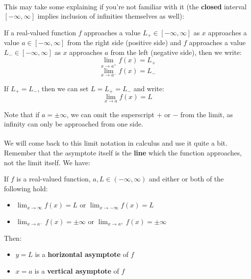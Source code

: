 \documentclass[12pt, a4paper, titlepage, twoside]{article}
\begin{document}
	\paragraph{}
	This may take some explaining if you're not familiar with it (the \textbf{closed} interval $[-\infty, \infty]$ implies inclusion of 
	infinities themselves as well):\\
	
	\begin{kp}
		If a real-valued function $f$ approaches a value $L_+ \in [-\infty, \infty]$
		as $x$ approaches a value $a \in [-\infty, \infty]$ from the right side (positive side) and $f$ approaches a value $L_- \in [-\infty, \infty]$
		as $x$ approaches $a$ from the left (negative side), then we write:
		\[ \lim_{x \to a^+} f(x) = L_+ \]
		\[ \lim_{x \to a^-} f(x) = L_- \]
		
		If $L_+ = L_-$, then we can set $L = L_+ = L_-$ and write:
		\[ \lim_{x \to a} f(x) = L \]
		
		Note that if $a = \pm \infty$, we can omit the superscript $+$ or $-$ from the limit, as infinity can only be approached from one side.
	\end{kp}
	
	\paragraph{}
	We will come back to this limit notation in calculus and use it quite a bit.
	Remember that the asymptote itself is the \textbf{line} which the function approaches, not the limit itself. We have:\\
	
	\begin{kp}[Asymptotes]
		If $f$ is a real-valued function, $a, L \in (-\infty, \infty)$ and either or both of the following hold:
		\begin{itemize}
			\item $\displaystyle \lim_{x \to \infty} f(x) = L$ or $\displaystyle \lim_{x \to -\infty} f(x) = L$
			\item $\displaystyle \lim_{x \to a^-} f(x) = \pm \infty$ or $\displaystyle \lim_{x \to a^+} f(x) = \pm \infty$
		\end{itemize}
		
		Then:
		\begin{itemize}
			\item $y = L$ is a \textbf{horizontal asymptote} of $f$
			\item $x = a$ is a \textbf{vertical asymptote} of $f$
		\end{itemize}
	\end{kp}
	
\end{document}

